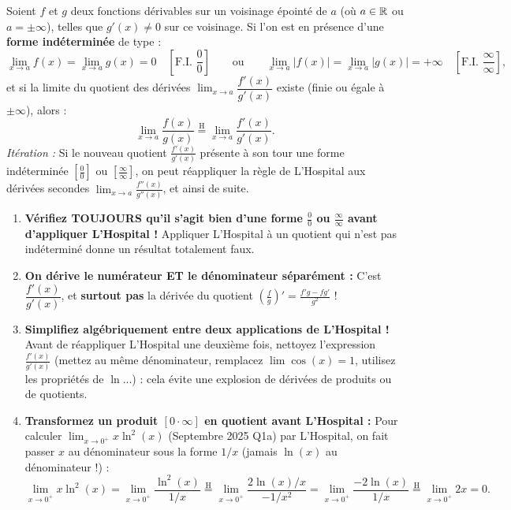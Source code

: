 \begin{theoreme}
Soient $f$ et $g$ deux fonctions dérivables sur un voisinage épointé de $a$ (où $a \in \mathbb{R}$ ou $a = \pm\infty$), telles que $g'(x) \neq 0$ sur ce voisinage. Si l'on est en présence d'une \textbf{forme indéterminée} de type :
\[
    \lim_{x \to a} f(x) = \lim_{x \to a} g(x) = 0 \quad \left[\text{F.I. } \frac{0}{0}\right] \qquad \text{ou} \qquad \lim_{x \to a} |f(x)| = \lim_{x \to a} |g(x)| = +\infty \quad \left[\text{F.I. } \frac{\infty}{\infty}\right],
\]
et si la limite du quotient des dérivées $\lim_{x \to a} \dfrac{f'(x)}{g'(x)}$ existe (finie ou égale à $\pm\infty$), alors :
\[
    \boxed{\lim_{x \to a} \frac{f(x)}{g(x)} \stackrel{\text{H}}{=} \lim_{x \to a} \frac{f'(x)}{g'(x)}}.
\]
\emph{Itération :} Si le nouveau quotient $\frac{f'(x)}{g'(x)}$ présente à son tour une forme indéterminée $\left[\frac{0}{0}\right]$ ou $\left[\frac{\infty}{\infty}\right]$, on peut réappliquer la règle de L'Hospital aux dérivées secondes $\lim_{x \to a} \frac{f''(x)}{g''(x)}$, et ainsi de suite.
\end{theoreme}

\begin{attention}
\begin{enumerate}
    \item \textbf{Vérifiez TOUJOURS qu'il s'agit bien d'une forme $\frac{0}{0}$ ou $\frac{\infty}{\infty}$ avant d'appliquer L'Hospital !} Appliquer L'Hospital à un quotient qui n'est pas indéterminé donne un résultat totalement faux.
    \item \textbf{On dérive le numérateur ET le dénominateur séparément :} C'est $\dfrac{f'(x)}{g'(x)}$, et \textbf{surtout pas} la dérivée du quotient $\left(\frac{f}{g}\right)' = \frac{f'g-fg'}{g^2}$ !
    \item \textbf{Simplifiez algébriquement entre deux applications de L'Hospital !} Avant de réappliquer L'Hospital une deuxième fois, nettoyez l'expression $\frac{f'(x)}{g'(x)}$ (mettez au même dénominateur, remplacez $\lim \cos(x) = 1$, utilisez les propriétés de $\ln$...) : cela évite une explosion de dérivées de produits ou de quotients.
    \item \textbf{Transformez un produit $[0 \cdot \infty]$ en quotient avant L'Hospital :} Pour calculer $\lim_{x \to 0^+} x\ln^2(x)$ (Septembre 2025 Q1a) par L'Hospital, on fait passer $x$ au dénominateur sous la forme $1/x$ (jamais $\ln(x)$ au dénominateur !) :
    \[
        \lim_{x \to 0^+} x\ln^2(x) = \lim_{x \to 0^+} \frac{\ln^2(x)}{1/x} \stackrel{\text{H}}{=} \lim_{x \to 0^+} \frac{2\ln(x)/x}{-1/x^2} = \lim_{x \to 0^+} \frac{-2\ln(x)}{1/x} \stackrel{\text{H}}{=} \lim_{x \to 0^+} 2x = 0.
    \]
\end{enumerate}
\end{attention}

